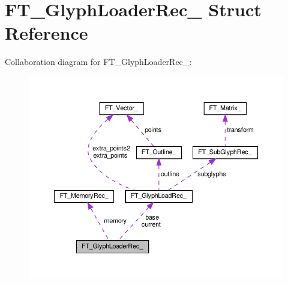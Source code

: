 \hypertarget{structFT__GlyphLoaderRec__}{}\section{F\+T\+\_\+\+Glyph\+Loader\+Rec\+\_\+ Struct Reference}
\label{structFT__GlyphLoaderRec__}


Collaboration diagram for F\+T\+\_\+\+Glyph\+Loader\+Rec\+\_\+\+:
\nopagebreak
\begin{figure}[H]
\begin{center}
\leavevmode
\includegraphics[width=350pt]{structFT__GlyphLoaderRec____coll__graph}
\end{center}
\end{figure}
